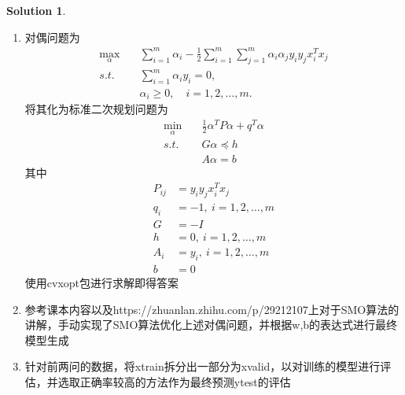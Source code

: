 \documentclass[a4paper,UTF8]{article}
\theoremstyle{definition}
\newtheorem*{solution}{Solution}
\begin{document}
\begin{solution}\ \\
	\begin{enumerate}[(1)]
		\item 对偶问题为
		\begin{equation*}
		\begin{split}
			\max_\alpha \quad &\sum_{i=1}^m\alpha_i -\frac{1}{2}\sum_{i=1}^m\sum_{j=1}^m\alpha_i\alpha_jy_iy_jx_i^Tx_j\\
			s.t. \quad &\sum_{i=1}^m \alpha_i y_i = 0,\\
			&\alpha_i \ge 0,\quad i=1,2,\dots,m.
		\end{split}
		\end{equation*}
		将其化为标准二次规划问题为
		\begin{equation*}
		\begin{split}
			\min_\alpha \quad &\frac{1}{2}\alpha^T P \alpha + q^T \alpha\\
			s.t. \quad &G\alpha \preceq h\\
			&A\alpha = b
		\end{split}
		\end{equation*}
		其中
		\begin{equation*}
		\begin{split}
			P_{ij} &= y_iy_jx_i^Tx_j\\
			q_i &= -1,\ i=1,2,\dots,m\\
			G &= -I\\
			h &= 0,\ i=1,2,\dots,m\\
			A_{i} &= y_i, \ i=1,2,\dots,m\\
			b &= 0
		\end{split}
		\end{equation*}
		使用cvxopt包进行求解即得答案

		\item 参考课本内容以及https://zhuanlan.zhihu.com/p/29212107上对于SMO算法的讲解，手动实现了SMO算法优化上述对偶问题，并根据w,b的表达式进行最终模型生成
		\item 针对前两问的数据，将xtrain拆分出一部分为xvalid，以对训练的模型进行评估，并选取正确率较高的方法作为最终预测ytest的评估
	\end{enumerate}
\end{solution}
\end{document}
